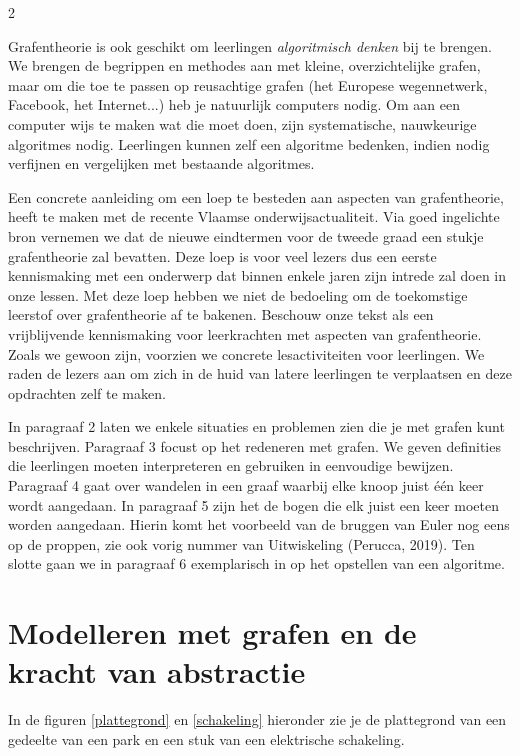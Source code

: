 \begin{multicols}{2}
\begin{opsomming}
\item Grafentheorie is ook geschikt om leerlingen \emph{algoritmisch denken} bij te brengen. We brengen de begrippen en methodes aan met kleine, overzichtelijke grafen, maar om die toe te passen op reusachtige grafen (het Europese wegennetwerk, Facebook, het Internet...) heb je natuurlijk computers nodig. Om aan een computer wijs te maken wat die moet doen, zijn systematische, nauwkeurige algoritmes nodig. Leerlingen kunnen zelf een algoritme bedenken, indien nodig verfijnen en vergelijken met bestaande algoritmes.

\end{opsomming}

Een concrete aanleiding om een loep te besteden aan aspecten van grafentheorie, heeft te maken met de recente Vlaamse onderwijsactualiteit. Via goed ingelichte bron vernemen we dat de nieuwe eindtermen voor de tweede graad een stukje grafentheorie zal bevatten. Deze loep is voor veel lezers dus een eerste kennismaking met een onderwerp dat binnen enkele jaren zijn intrede zal doen in onze lessen. Met deze loep hebben we niet de bedoeling om de toekomstige leerstof over grafentheorie af te bakenen. Beschouw onze tekst als een vrijblijvende kennismaking voor leerkrachten met aspecten van grafentheorie. Zoals we gewoon zijn, voorzien we concrete lesactiviteiten voor leerlingen. We raden de lezers aan om zich in de huid van latere leerlingen te verplaatsen en deze opdrachten zelf te maken.

In paragraaf 2 laten we enkele situaties en problemen zien die je met grafen kunt beschrijven. Paragraaf 3 focust op het redeneren met grafen. We geven definities die leerlingen moeten interpreteren en gebruiken in eenvoudige bewijzen. Paragraaf 4 gaat over wandelen in een graaf waarbij elke knoop juist één keer wordt aangedaan. In paragraaf 5 zijn het de bogen die elk juist een keer moeten worden aangedaan. Hierin komt het voorbeeld van de bruggen van Euler nog eens op de proppen, zie ook vorig nummer van Uitwiskeling (Perucca, 2019). Ten slotte gaan we in paragraaf 6 exemplarisch in op het opstellen van een algoritme.


\section{Modelleren met grafen en de kracht van abstractie}

In de figuren \ref{plattegrond} en \ref{schakeling} hieronder zie je de plattegrond van een gedeelte van een park en een stuk van een elektrische schakeling.


\end{multicols}
